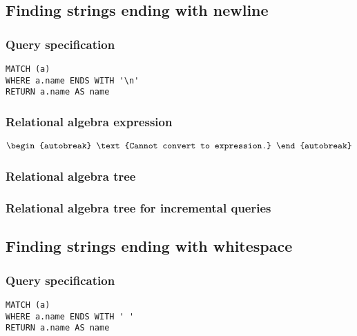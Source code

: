 
\subsection{Finding strings ending with newline}

\subsubsection*{Query specification}

\begin{lstlisting}
MATCH (a)
WHERE a.name ENDS WITH '\n'
RETURN a.name AS name
\end{lstlisting}

\subsubsection*{Relational algebra expression}

\begin{align*}
\begin{autobreak}
\text{Cannot convert to expression.}
\end{autobreak}
\end{align*}

\subsubsection*{Relational algebra tree}


\subsubsection*{Relational algebra tree for incremental queries}


\subsection{Finding strings ending with whitespace}

\subsubsection*{Query specification}

\begin{lstlisting}
MATCH (a)
WHERE a.name ENDS WITH ' '
RETURN a.name AS name
\end{lstlisting}

